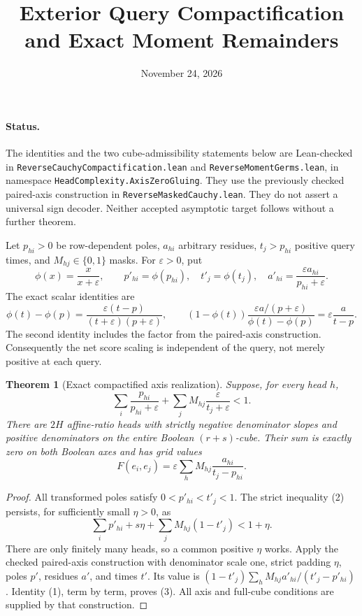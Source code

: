 \documentclass[11pt]{article}
\title{Exterior Query Compactification and Exact Moment Remainders}
\author{}
\date{November 24, 2026}
\newtheorem{theorem}{Theorem}
\begin{document}
\maketitle

\paragraph{Status.}
The identities and the two cube-admissibility statements below are
Lean-checked in \texttt{ReverseCauchyCompactification.lean} and
\texttt{ReverseMomentGerms.lean}, in namespace
\texttt{HeadComplexity.AxisZeroGluing}. They use the previously checked
paired-axis construction in \texttt{ReverseMaskedCauchy.lean}.
They do not assert a universal sign decoder. Neither accepted
asymptotic target follows without a further theorem.

Let $p_{hi}>0$ be row-dependent poles, $a_{hi}$ arbitrary residues,
$t_j>p_{hi}$ positive query times, and $M_{hj}\in\{0,1\}$ masks.
For $\varepsilon>0$, put
\[
 \phi(x)=\frac{x}{x+\varepsilon},\qquad
 p'_{hi}=\phi(p_{hi}),\quad t'_j=\phi(t_j),\quad
 a'_{hi}=\frac{\varepsilon a_{hi}}{p_{hi}+\varepsilon}.
\]
The exact scalar identities are
\[
 \phi(t)-\phi(p)
 =\frac{\varepsilon(t-p)}{(t+\varepsilon)(p+\varepsilon)},
 \qquad
 (1-\phi(t))\frac{\varepsilon a/(p+\varepsilon)}{\phi(t)-\phi(p)}
 =\varepsilon\frac a{t-p}.
 \tag{1}
\]
The second identity includes the factor from the paired-axis
construction. Consequently the net score scaling is independent of
the query, not merely positive at each query.

\begin{theorem}[Exact compactified axis realization]
Suppose, for every head $h$,
\[
 \sum_i\frac{p_{hi}}{p_{hi}+\varepsilon}
 +\sum_j M_{hj}\frac{\varepsilon}{t_j+\varepsilon}<1.
 \tag{2}
\]
There are $2H$ affine-ratio heads with strictly negative denominator
slopes and positive denominators on the entire Boolean $(r+s)$-cube.
Their sum is exactly zero on both Boolean axes and has grid values
\[
 F(e_i,e_j)=\varepsilon\sum_h M_{hj}\frac{a_{hi}}{t_j-p_{hi}}.
 \tag{3}
\]
\end{theorem}
\begin{proof}
All transformed poles satisfy $0<p'_{hi}<t'_j<1$.
The strict inequality (2) persists, for sufficiently small $\eta>0$,
as
\[
 \sum_i p'_{hi}+s\eta+\sum_jM_{hj}(1-t'_j)<1+\eta.
\]
There are only finitely many heads, so a common positive $\eta$ works.
Apply the checked paired-axis construction with denominator scale
one, strict padding $\eta$, poles $p'$, residues $a'$, and times $t'$.
Its value is
$(1-t'_j)\sum_h M_{hj}a'_{hi}/(t'_j-p'_{hi})$.
Identity (1), term by term, proves (3). All axis and full-cube
conditions are supplied by that construction.
\end{proof}
\end{document}
